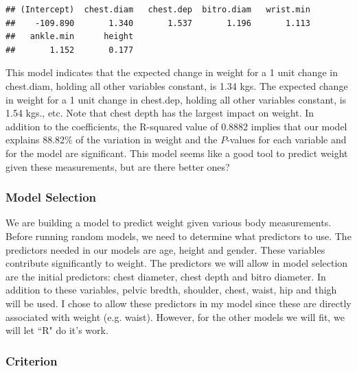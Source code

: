 \documentclass[11pt]{article}\usepackage[]{graphicx}\usepackage[]{color}
\makeatletter
\newenvironment{kframe}{%
 \def\at@end@of@kframe{}%
 \ifinner\ifhmode%
  \def\at@end@of@kframe{\end{minipage}}%
  \begin{minipage}{\columnwidth}%
 \fi\fi%
 \def\FrameCommand##1{\hskip\@totalleftmargin \hskip-\fboxsep
 \colorbox{shadecolor}{##1}\hskip-\fboxsep
     \hskip-\linewidth \hskip-\@totalleftmargin \hskip\columnwidth}%
 \MakeFramed {\advance\hsize-\width
   \@totalleftmargin\z@ \linewidth\hsize
   \@setminipage}}%
 {\par\unskip\endMakeFramed%
 \at@end@of@kframe}
\newenvironment{knitrout}{}{} %
\makeatother
\begin{document}
\begin{knitrout}
\color{fgcolor}\begin{kframe}
\begin{verbatim}
## (Intercept)  chest.diam   chest.dep  bitro.diam   wrist.min 
##    -109.890       1.340       1.537       1.196       1.113 
##   ankle.min      height 
##       1.152       0.177
\end{verbatim}
\end{kframe}
\end{knitrout}


This model indicates that the expected change in weight for a 1 unit change in chest.diam, holding all other variables constant, is 1.34 kgs. The expected change in weight for a 1 unit change in chest.dep, holding all other variables constant, is 1.54 kgs., etc. Note that chest depth has the largest impact on weight. In addition to the coefficients, the R-squared value of 0.8882 implies that our model explains 88.82\% of the variation in weight and the $P$-values for each variable and for the model are significant. This model seems like a good tool to predict weight given these measurements, but are there better ones?

\subsubsection{Model Selection}

We are building a model to predict weight given various body measurements. Before running random models, we need to determine what predictors to use. The predictors needed in our models are age, height and gender. These variables contribute significantly to weight. The predictors we will allow in model selection are the initial predictors: chest diameter, chest depth and bitro diameter. In addition to these variables, pelvic bredth, shoulder, chest, waist, hip and thigh will be used. I chose to allow these predictors in my model since these are directly associated with weight (e.g. waist). However, for the other models we will fit, we will let ``R" do it's work.

\subsubsection{Criterion}
\end{document}
